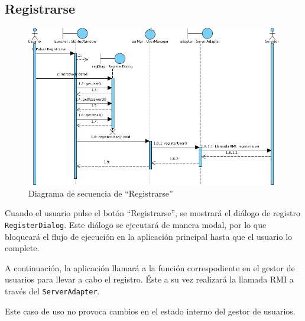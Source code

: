 \subsection{Registrarse}

\begin{figure}[ht]
\centering
\includegraphics[scale=0.6]{img/ch03devel-register.png}
\caption{Diagrama de secuencia de ``Registrarse''}
\end{figure}

Cuando el usuario pulse el botón ``Registrarse'', se mostrará el diálogo de
registro \texttt{RegisterDialog}. Este diálogo se ejecutará de manera modal,
por lo que bloqueará el flujo de ejecución en la aplicación principal hasta que
el usuario lo complete.

A continuación, la aplicación llamará a la función correspodiente en el gestor
de usuarios para llevar a cabo el registro. Éste a su vez realizará la llamada
RMI a través del \texttt{ServerAdapter}.

Este caso de uso no provoca cambios en el estado interno del gestor de usuarios.
